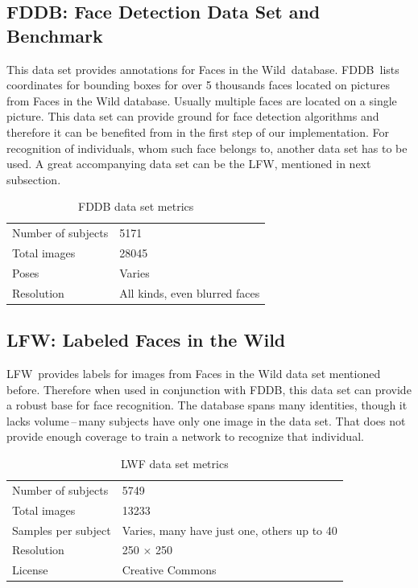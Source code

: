 \subsection{FDDB: Face Detection Data Set and Benchmark}

This data set provides annotations for Faces in the Wild\,\cite{fiw} database. FDDB\,\cite{fddb} lists coordinates for bounding boxes for over 5 thousands faces located on pictures from Faces in the Wild database. Usually multiple faces are located on a single picture. This data set can provide ground for face detection algorithms and therefore it can be benefited from in the first step of our implementation. For recognition of individuals, whom such face belongs to, another data set has to be used. A great accompanying data set can be the LFW, mentioned in next subsection.

\begin{table}[ht]
    \centering
    \begin{tabularx}{.8\textwidth}{l|X}
        \toprule
        Number of subjects & \num{5171} \\
        Total images &  \num{28045} \\
        Poses & Varies \\
        Resolution & All kinds, even blurred faces \\
        \bottomrule
    \end{tabularx}
    \caption{FDDB data set metrics}
\end{table}

\subsection{LFW: Labeled Faces in the Wild}
\label{ss:lfw}

LFW\,\cite{lfw} provides labels for images from Faces in the Wild data set mentioned before. Therefore when used in conjunction with FDDB, this data set can provide a robust base for face recognition. The database spans many identities, though it lacks volume\,--\,many subjects have only one image in the data set. That does not provide enough coverage to train a network to recognize that individual.

\begin{table}[ht]
    \centering
    \begin{tabularx}{.8\textwidth}{l|X}
        \toprule
        Number of subjects & \num{5749} \\
        Total images & \num{13233} \\
        Samples per subject & Varies, many have just one, others up to 40 \\
        Resolution & 250 $\times$ 250 \\
        License & Creative Commons \\
        \bottomrule
    \end{tabularx}
    \caption{LWF data set metrics}
\end{table}

